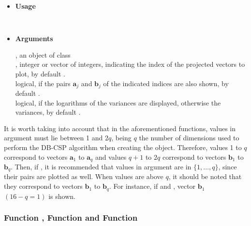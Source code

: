 \begin{itemize}
\item{\bf Usage}

\\

\item{\bf Arguments}

, an object of class \\

, integer or vector of integers, indicating the index of the projected vectors to plot, by default .\\

 logical, if  the pairs $\mathbf{a}_j$ and $\mathbf{b}_j$ of the indicated indices are also shown, by default .\\

 logical, if  the logarithms of the variances are displayed, otherwise  the variances, by default .\\
\end{itemize}

\bigskip

It is worth taking into account that in the aforementioned functions, values in argument   must lie between 1 and $2q$, being $q$ the number of dimensions used to perform the DB-CSP algorithm when creating the  object. Therefore, values 1 to $q$ correspond to vectors $\mathbf{a}_1$ to $\mathbf{a}_q$ and values $q+1$ to $2q$ correspond to vectors $\mathbf{b}_1$ to $\mathbf{b}_q$. Then, if , it is recommended that values in argument  are in $\{1, \ldots, q\}$, since their pairs are plotted as well. When values are above $q$, it should be noted that they correspond to vectors $\mathbf{b}_1$ to $\mathbf{b}_q$. For instance,  if  and , vector $\mathbf{b}_1$ $(16-q=1)$  is shown.





\subsubsection{Function , Function   and Function }

